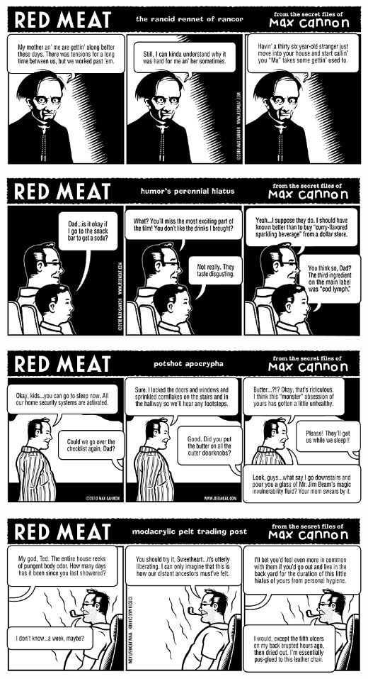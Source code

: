 \documentclass[a4paper,twoside,11pt]{article}
\begin{document}
\includegraphics[width=\textwidth]{redmeat_2010-03-09.png}



\includegraphics[width=\textwidth]{redmeat_2010-03-16.png}



\includegraphics[width=\textwidth]{redmeat_2010-03-23.png}



\includegraphics[width=\textwidth]{redmeat_2010-03-30.png}
\end{document}
